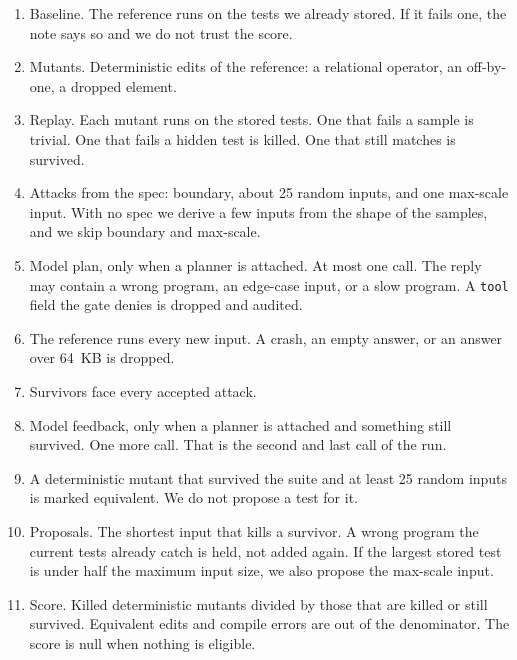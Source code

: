\documentclass[11pt,a4paper]{article}
\begin{document}
\begin{enumerate}
\item Baseline. The reference runs on the tests we already stored. If it fails one, the note says so and we do not trust the score.
\item Mutants. Deterministic edits of the reference: a relational operator, an off-by-one, a dropped element.
\item Replay. Each mutant runs on the stored tests. One that fails a sample is trivial. One that fails a hidden test is killed. One that still matches is survived.
\item Attacks from the spec: boundary, about 25 random inputs, and one max-scale input. With no spec we derive a few inputs from the shape of the samples, and we skip boundary and max-scale.
\item Model plan, only when a planner is attached. At most one call. The reply may contain a wrong program, an edge-case input, or a slow program. A \texttt{tool} field the gate denies is dropped and audited.
\item The reference runs every new input. A crash, an empty answer, or an answer over 64~KB is dropped.
\item Survivors face every accepted attack.
\item Model feedback, only when a planner is attached and something still survived. One more call. That is the second and last call of the run.
\item A deterministic mutant that survived the suite and at least 25 random inputs is marked equivalent. We do not propose a test for it.
\item Proposals. The shortest input that kills a survivor. A wrong program the current tests already catch is held, not added again. If the largest stored test is under half the maximum input size, we also propose the max-scale input.
\item Score. Killed deterministic mutants divided by those that are killed or still survived. Equivalent edits and compile errors are out of the denominator. The score is null when nothing is eligible.
\end{enumerate}
\end{document}
